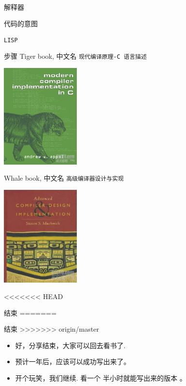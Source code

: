 \documentclass[presentation, bigger]{beamer}
\begin{document}
\begin{frame}[label={sec:org106539d},fragile]{解释器}
\begin{frame}[label={sec:org3020c49},fragile]{代码的意图}
\begin{frame}[label={sec:org3aa0441},fragile]{\texttt{LISP}}
\begin{frame}[fragile,allowframebreaks,label=]{步骤}
\framebreak
\alert{Tiger book}, 中文名 \texttt{现代编译原理-C 语言描述}
\begin{center}
\includegraphics[width=0.3\textwidth]{./img/tiger.jpg}
\end{center}

\framebreak

\alert{Whale book}, 中文名 \texttt{高级编译器设计与实现}
\begin{center}
\includegraphics[width=0.3\textwidth]{./img/whale.jpg}
\end{center}
\end{frame}

<<<<<<< HEAD
\begin{frame}[label={sec:orgae54002}]{结束}
=======
\begin{frame}[label={sec:orga8944f3}]{结束}
>>>>>>> origin/master
\begin{itemize}
\item <+-> 好，分享结束，大家可以回去看书了.
\item <2-> 预计一年后，应该可以成功写出来了。
\item <3> 开个玩笑，我们继续. 看一个 \alert{半小时就能写出来的版本} 。
\end{itemize}
\end{frame}


\end{frame}
\end{frame}
\end{frame}
\end{frame}
\end{document}
